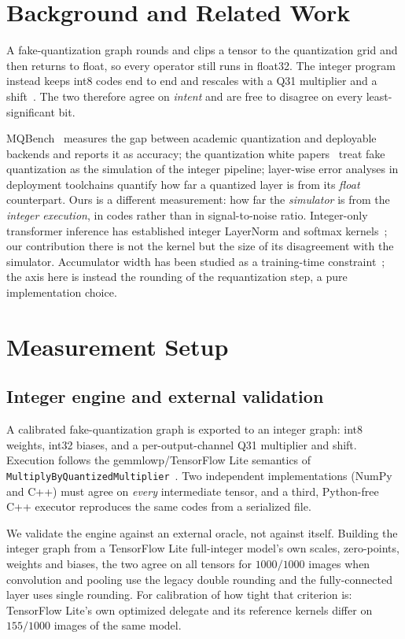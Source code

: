 \documentclass[journal]{IEEEtran}
\begin{document}
\section{Background and Related Work}
A fake-quantization graph rounds and clips a tensor to the quantization grid and then returns to float, so
every operator still runs in float32. The integer program instead keeps int8 codes end to end and rescales
with a Q31 multiplier and a shift~\cite{jacob2018,gemmlowp}. The two therefore agree on \emph{intent} and
are free to disagree on every least-significant bit.

MQBench~\cite{mqbench} measures the gap between academic quantization and deployable backends and reports it as
accuracy; the quantization white papers~\cite{nagel2021,krishnamoorthi2018} treat fake quantization as the
simulation of the integer pipeline; layer-wise error analyses in deployment toolchains quantify how far a
quantized layer is from its \emph{float} counterpart. Ours is a different measurement: how far the
\emph{simulator} is from the \emph{integer execution}, in codes rather than in signal-to-noise ratio.
Integer-only transformer inference has established integer LayerNorm and softmax kernels~\cite{ibert,fqvit};
our contribution there is not the kernel but the size of its disagreement with the simulator. Accumulator width
has been studied as a training-time constraint~\cite{a2q}; the axis here is instead the rounding of the
requantization step, a pure implementation choice.

\section{Measurement Setup}

\subsection{Integer engine and external validation}
A calibrated fake-quantization graph is exported to an integer graph: int8 weights, int32 biases, and a
per-output-channel Q31 multiplier and shift. Execution follows the gemmlowp/TensorFlow Lite semantics of
\texttt{MultiplyByQuantizedMultiplier}~\cite{gemmlowp}. Two independent implementations (NumPy and C++) must
agree on \emph{every} intermediate tensor, and a third, Python-free C++ executor reproduces the same codes
from a serialized file.

We validate the engine against an external oracle, not against itself. Building the integer graph from a
TensorFlow Lite full-integer model's own scales, zero-points, weights and biases, the two agree on all
tensors for $1000/1000$ images when convolution and pooling use the legacy double rounding and the
fully-connected layer uses single rounding. For calibration of how tight that criterion is: TensorFlow Lite's
own optimized delegate and its reference kernels differ on $155/1000$ images of the same model.
\end{document}
